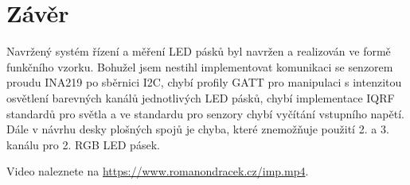\documentclass[12pt]{article}
\begin{document}
	\section{Závěr}
	
	Navržený systém řízení a měření LED pásků byl navržen a realizován ve formě funkčního vzorku. Bohužel jsem nestihl implementovat komunikaci se senzorem proudu INA219 po sběrnici I2C, chybí profily GATT pro manipulaci s intenzitou osvětlení barevných kanálů jednotlivých LED pásků, chybí implementace IQRF standardů pro světla a ve standardu pro senzory chybí vyčítání vstupního napětí. Dále v návrhu desky plošných spojů je chyba, které znemožňuje použití 2. a 3. kanálu pro 2. RGB LED pásek.
	
	Video naleznete na \url{https://www.romanondracek.cz/imp.mp4}.
\end{document}
